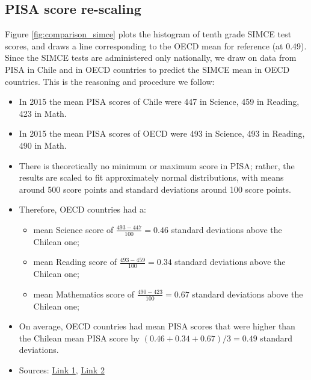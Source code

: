 \subsection{PISA score re-scaling}\label{sec:PISA}

Figure \ref{fig:comparison_simce} plots the histogram of tenth grade SIMCE test scores, and draws a line corresponding to the OECD mean for reference (at 0.49). Since the SIMCE tests are administered only nationally, we draw on data from PISA in Chile and in OECD countries to predict the SIMCE mean in OECD countries. This is the reasoning and procedure we follow: 


\begin{itemize}
    \item In 2015 the mean PISA scores of Chile were 447 in Science, 459 in Reading, 423 in Math.
    \item In 2015 the mean PISA scores of OECD were 493 in Science, 493 in Reading, 490 in Math.
    \item There is theoretically no minimum or maximum score in PISA; rather, the results are scaled to fit approximately normal distributions, with means around 500 score points and
standard deviations around 100 score points.
\item Therefore, OECD countries had a:
\begin{itemize}
    \item mean Science score of $\frac{493-447}{100}=0.46$ standard deviations above the Chilean one;
    \item mean Reading score of $\frac{493-459}{100}=0.34$ standard deviations above the Chilean one;
    \item mean Mathematics score of $\frac{490-423}{100}=0.67$ standard deviations above the Chilean one;
    
\end{itemize}
\item On average, OECD countries had mean PISA scores that were higher than the Chilean mean PISA score by $(0.46+0.34+0.67)/3=0.49$ standard deviations.
\item Sources: \href{https://www.oecd.org/pisa/pisa-2015-results-in-focus.pdf}{Link 1},  \href{https://www.oecd-ilibrary.org/docserver/35665b60-en.pdf?expires=1680550798&id=id&accname=ocid195693&checksum=113A5313C82B038E32AA28364279166D}{Link 2}
\end{itemize}


